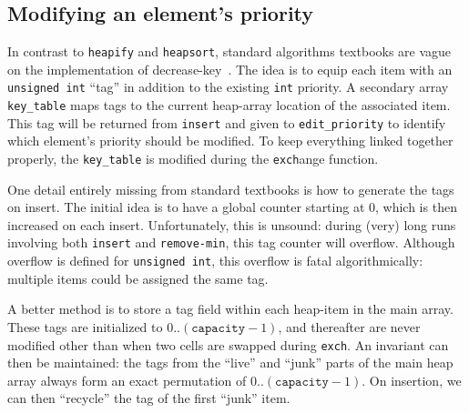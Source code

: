 \subsection{Modifying an element's priority}

In contrast to \texttt{heapify} and \texttt{heapsort}, standard algorithms textbooks are vague on the implementation of decrease-key~\cite{CLRS,Sedgewick}.  The idea is to equip each item with an \texttt{unsigned int} ``tag'' in addition to the existing \texttt{int} priority. A secondary array \texttt{key\_table} maps tags to the current heap-array location of the associated item.  This tag will be returned from \texttt{insert} and given to \texttt{edit\_priority} to identify which element's priority should be modified.  To keep everything linked together properly, the \texttt{key\_table} is modified during the \texttt{exch}ange function.

One detail entirely missing from standard textbooks is how to generate the tags on insert.  The initial idea is to have a global counter starting at 0, which is then increased on each insert.  Unfortunately, this is unsound: during (very) long runs involving both \texttt{insert} and \texttt{remove-min}, this tag counter will overflow.  Although overflow is defined for \texttt{unsigned int}, this overflow is fatal algorithmically: multiple items could be assigned the same tag.

A better method is to store a tag field within each heap-item in the main array.  These tags are initialized to $0..(\texttt{capacity}-1)$, and thereafter are never modified other than when two cells are swapped during \texttt{exch}.  An invariant can then be maintained: the tags from the ``live'' and ``junk'' parts of the main heap array always form an exact permutation of $0..(\texttt{capacity}-1)$.  On insertion, we can then ``recycle'' the tag of the first ``junk'' item.

